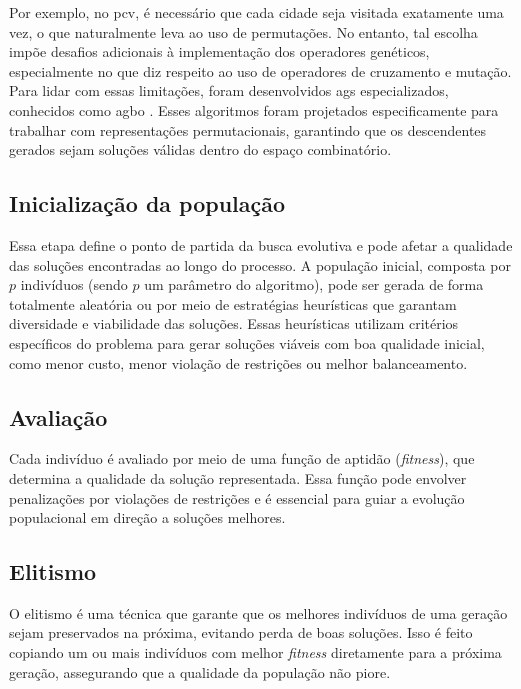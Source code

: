 Por exemplo, no \gls{pcv}, é necessário que cada cidade seja visitada exatamente uma vez, o que naturalmente leva ao uso de permutações. No entanto, tal escolha impõe desafios adicionais à implementação dos operadores genéticos, especialmente no que diz respeito ao uso de operadores de cruzamento e mutação. Para lidar com essas limitações, foram desenvolvidos \gls{ag}s especializados, conhecidos como \gls{agbo} \cite{syswerda1991schedule}. Esses algoritmos foram projetados especificamente para trabalhar com representações permutacionais, garantindo que os descendentes gerados sejam soluções válidas dentro do espaço combinatório.



\subsection{Inicialização da população}

Essa etapa define o ponto de partida da busca evolutiva e pode afetar a qualidade das soluções encontradas ao longo do processo. A população inicial, composta por $p$ indivíduos (sendo $p$ um parâmetro do algoritmo), pode ser gerada de forma totalmente aleatória ou por meio de estratégias heurísticas que garantam diversidade e viabilidade das soluções. Essas heurísticas utilizam critérios específicos do problema para gerar soluções viáveis com boa qualidade inicial, como menor custo, menor violação de restrições ou melhor balanceamento.

\subsection{Avaliação}

Cada indivíduo é avaliado por meio de uma função de aptidão (\textit{fitness}), que determina a qualidade da solução representada. Essa função pode envolver penalizações por violações de restrições e é essencial para guiar a evolução populacional em direção a soluções melhores.

\subsection{Elitismo}

O elitismo é uma técnica que garante que os melhores indivíduos de uma geração sejam preservados na próxima, evitando perda de boas soluções. Isso é feito copiando um ou mais indivíduos com melhor \textit{fitness} diretamente para a próxima geração, assegurando que a qualidade da população não piore.

